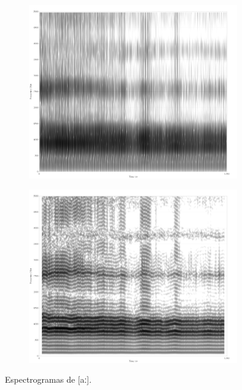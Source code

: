 \begin{figure}[!ht]
	\centering
	\begin{subfigure}{0.49\textwidth}
		\includegraphics[width=\textwidth]{images/awidex}
		\label{fig:awide}
	\end{subfigure}
	\begin{subfigure}{0.49\textwidth}
		\includegraphics[width=\textwidth]{images/anarrowx}
		\label{fig:anarrow}
	\end{subfigure}
	\caption{Espectrogramas de [aː].}
	\label{fig:sonogramas}
\end{figure}



